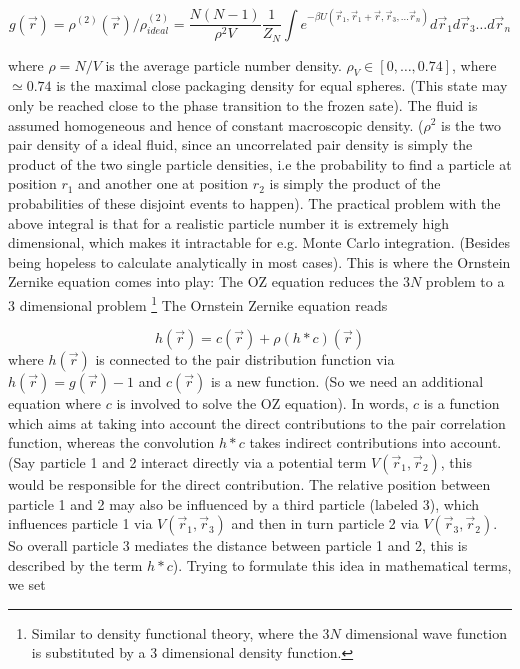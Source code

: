 \documentclass[11pt,a4paper]{article}
\begin{document}
\begin{equation}
g(\vec r) = \rho^{(2)} (\vec r)/ \rho_{ideal}^{(2)} =
\frac{N(N-1)}{\rho^2 V} \frac{1}{Z_N}\int e^{-\beta U(\vec r_1, \vec r_1 + \vec r,\vec r_3,\dots \vec r_n)} d\vec r_1 d\vec r_3 \dots d\vec r_n
\end{equation}

where $\rho = N/V$ is the average particle number density. $\rho_V \in [0, \dots, 0.74]$, where $\simeq 0.74$ is the maximal close packaging 
density for equal spheres. (This state may only be reached close to the phase transition to the frozen sate).
The fluid is assumed homogeneous and hence of constant macroscopic density. ($\rho^2$ is the two pair density of a ideal fluid, 
since an uncorrelated pair density is simply the product of the two single particle densities, i.e the probability to find a particle at position $r_1$
and another one at position $r_2$ is simply the product of the probabilities of these disjoint events to happen).\newline
The practical problem with the above integral is that for a realistic particle number it is extremely high dimensional, which makes it intractable for
e.g. Monte Carlo integration. (Besides being hopeless to calculate analytically in most cases). This is where the Ornstein Zernike equation comes
into play: The OZ equation reduces the $3N$ problem to a 3 dimensional problem \footnote{Similar to density functional theory, where the 3$N$
dimensional wave function is substituted by a 3 dimensional density function.} 
The Ornstein Zernike equation reads

\begin{equation}
h(\vec r) = c(\vec r) + \rho (h*c) (\vec r)
\end{equation}
where $h(\vec r)$ is connected to the pair distribution function via $h(\vec r) = g(\vec r) -1$ and $c(\vec r)$ is a new function. (So we need an additional equation
where $c$ is involved to solve the OZ equation). In words, $c$ is a function which aims at taking into account the direct contributions to the pair correlation
function, whereas the convolution $h*c$ takes indirect contributions into account. (Say particle 1 and 2 interact directly via a potential term $V(\vec r_1, \vec r_2)$, this
would be responsible for the direct contribution. The relative position between particle 1 and 2 may also be influenced by a third particle (labeled 3),
which influences particle 1 via $V(\vec r_1, \vec r_3)$ and then in turn particle 2 via $V(\vec r_3, \vec r_2)$. So overall particle 3 mediates the distance between particle 1 and 2,
this is described by the term $h*c$). \newline Trying to formulate this idea in mathematical terms, we set
\end{document}
